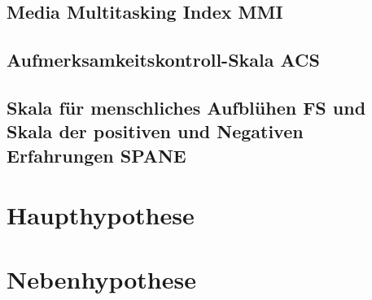 \subsection{Media Multitasking Index MMI}
\subsection{Aufmerksamkeitskontroll-Skala ACS}
\subsection{Skala für menschliches Aufblühen FS und Skala der positiven und Negativen Erfahrungen SPANE}


\section{Haupthypothese}\label{label.haupthypothese}
\section{Nebenhypothese}\label{label.nebenhypothese}


